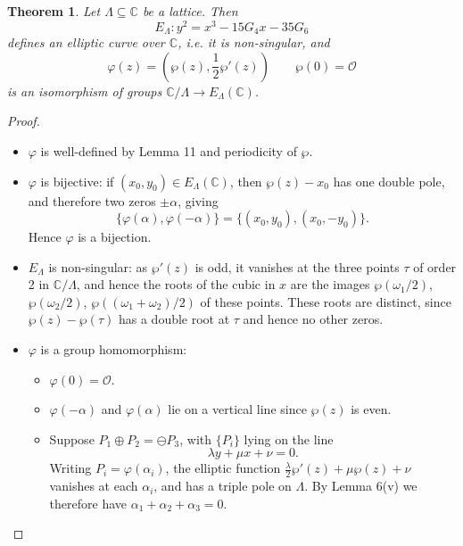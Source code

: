 \documentclass[a4paper]{article}
\newtheorem{theorem}{Theorem}
\theoremstyle{definition}
\renewcommand{\O}{\mathcal{O}}
\newcommand{\C}{\mathbb{C}}
\begin{document}
\begin{theorem}
    Let $\Lambda\subseteq\C$ be a lattice. Then
    \begin{equation*}
        E_\Lambda : y^2 = x^3 - 15G_4x - 35G_6
    \end{equation*}
    defines an elliptic curve over $\C$, i.e. it is non-singular, and
    \begin{equation*}
        \varphi(z) = (\wp(z),\frac{1}{2}\wp'(z)) \qquad \wp(0)=\O
    \end{equation*}
    is an isomorphism of groups $\C/\Lambda\to E_\Lambda(\C)$.
\end{theorem}

\begin{proof}
    \begin{itemize}
        \item $\varphi$ is well-defined by Lemma 11 and periodicity of $\wp$.

        \item $\varphi$ is bijective: if $(x_0,y_0)\in E_\Lambda(\C)$, then
            $\wp(z)-x_0$ has one double pole, and therefore two zeros
            $\pm\alpha$, giving
            \begin{equation*}
                \{\varphi(\alpha),\varphi(-\alpha)\} = \{(x_0,y_0),(x_0,-y_0)\}.
            \end{equation*}
            Hence $\varphi$ is a bijection.

        \item $E_\Lambda$ is non-singular: as $\wp'(z)$ is odd, it vanishes at
            the three points $\tau$ of order 2 in $\C/\Lambda$, and hence the
            roots of the cubic in $x$ are the images $\wp(\omega_1/2)$,
            $\wp(\omega_2/2)$, $\wp((\omega_1+\omega_2)/2)$ of these points.
            These roots are distinct, since $\wp(z)-\wp(\tau)$ has a double root
            at $\tau$ and hence no other zeros.

        \item $\varphi$ is a group homomorphism:
            \begin{itemize}
                \item $\varphi(0)=\O$.
                \item $\varphi(-\alpha)$ and $\varphi(\alpha)$ lie on a vertical
                    line since $\wp(z)$ is even.

                \item Suppose $P_1\oplus P_2=\ominus P_3$, with $\{P_i\}$ lying
                    on the line
                    \begin{equation*}
                        \lambda y + \mu x + \nu = 0.
                    \end{equation*}
                    Writing $P_i=\varphi(\alpha_i)$, the elliptic function
                    $\frac{\lambda}{2}\wp'(z)+\mu\wp(z)+\nu$ vanishes at each
                    $\alpha_i$, and has a triple pole on $\Lambda$. By Lemma
                    6(v) we therefore have $\alpha_1+\alpha_2+\alpha_3=0$.
            \end{itemize}
    \end{itemize}
\end{proof}
\end{document}
